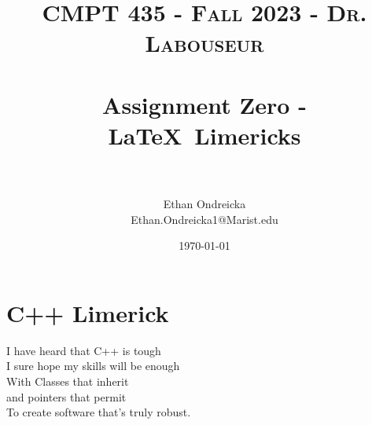 \documentclass{article}
\title{	
   \normalfont \normalsize 
   \textsc{CMPT 435 - Fall 2023 - Dr. Labouseur} \\[10pt] %
   \horrule{0.5pt} \\[0.25cm] 	%
   \huge Assignment Zero - \LaTeX ~Limericks  \\     	    %
   \horrule{0.5pt} \\[0.25cm] 	%
}
\author{Ethan Ondreicka \\ \normalsize Ethan.Ondreicka1@Marist.edu}
\date{\normalsize\today} 	%
\begin{document}
\maketitle
    \section*{C++ Limerick}
    I have heard that C++ is tough \\
    I sure hope my skills will be enough \\
        \hspace*{1.5em}With Classes that inherit \\
        \hspace*{1.5em}and pointers that permit \\
    To create software that's truly robust. \\
\end{document}
